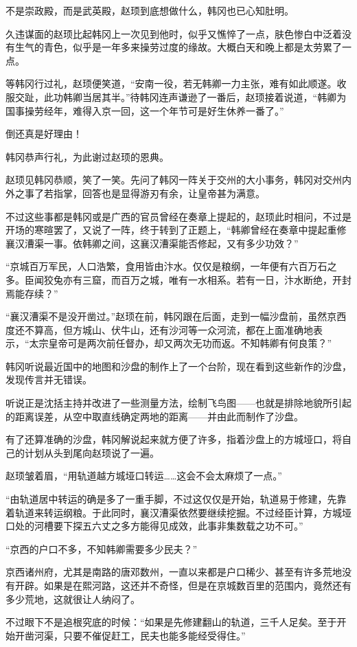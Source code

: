 不是崇政殿，而是武英殿，赵顼到底想做什么，韩冈也已心知肚明。

久违谋面的赵顼比起韩冈上一次见到他时，似乎又憔悴了一点，肤色惨白中泛着没有生气的青色，似乎是一年多来操劳过度的缘故。大概白天和晚上都是太劳累了一点。

等韩冈行过礼，赵顼便笑道，“安南一役，若无韩卿一力主张，难有如此顺遂。收服交趾，此功韩卿当居其半。”待韩冈连声谦逊了一番后，赵顼接着说道，“韩卿为国事操劳经年，难得入京一回，这一个年节可是好生休养一番了。”

倒还真是好理由！

韩冈恭声行礼，为此谢过赵顼的恩典。

赵顼见韩冈恭顺，笑了一笑。先问了韩冈一阵关于交州的大小事务，韩冈对交州内外之事了若指掌，回答也是显得游刃有余，让皇帝甚为满意。

不过这些事都是韩冈或是广西的官员曾经在奏章上提起的，赵顼此时相问，不过是开场的寒暄罢了，又说了一阵，终于转到了正题上，“韩卿曾经在奏章中提起重修襄汉漕渠一事。依韩卿之间，这襄汉漕渠能否修起，又有多少功效？”

“京城百万军民，人口浩繁，食用皆由汴水。仅仅是粮纲，一年便有六百万石之多。臣闻狡兔亦有三窟，而百万之城，唯有一水相系。若有一日，汴水断绝，开封焉能存续？”

“襄汉漕渠不是没开凿过。”赵顼在前，韩冈跟在后面，走到一幅沙盘前，虽然京西度还不算高，但方城山、伏牛山，还有沙河等一众河流，都在上面准确地表示，“太宗皇帝可是两次前任督办，却又两次无功而返。不知韩卿有何良策？”

韩冈听说最近国中的地图和沙盘的制作上了一个台阶，现在看到这些新作的沙盘，发现传言并无错误。

听说正是沈括主持并改进了一些测量方法，绘制飞鸟图——也就是排除地貌所引起的距离误差，从空中取直线确定两地的距离——并由此而制作了沙盘。

有了还算准确的沙盘，韩冈解说起来就方便了许多，指着沙盘上的方城垭口，将自己的计划从头到尾向赵顼说了一遍。

赵顼皱着眉，“用轨道越方城垭口转运……这会不会太麻烦了一点。”

“由轨道居中转运的确是多了一重手脚，不过这仅仅是开始，轨道易于修建，先靠着轨道来转运纲粮。于此同时，襄汉漕渠依然要继续挖掘。不过经臣计算，方城垭口处的河槽要下探五六丈之多方能得见成效，此事非集数载之功不可。”

“京西的户口不多，不知韩卿需要多少民夫？”

京西诸州府，尤其是南路的唐邓数州，一直以来都是户口稀少、甚至有许多荒地没有开辟。如果是在熙河路，这还并不奇怪，但是在京城数百里的范围内，竟然还有多少荒地，这就很让人纳闷了。

不过眼下不是追根究底的时候：“如果是先修建翻山的轨道，三千人足矣。至于开始开凿河渠，只要不催促赶工，民夫也能多能经受得住。”

